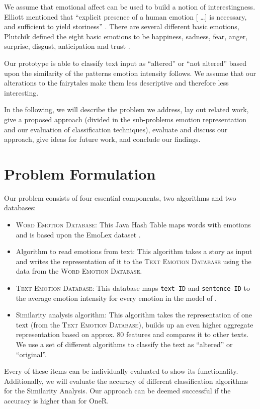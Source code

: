 \documentclass[letterpaper]{article}
\begin{document}
We assume that emotional affect can be used to build a notion of interestingness. Elliott mentioned that ``explicit presence of a human emotion [ \dots] is necessary, and sufficient to yield storiness'' \cite{elliott}. There are several different basic emotions, Plutchik defined the eight basic emotions to be happiness, sadness, fear, anger, surprise, disgust, anticipation and trust \cite{plutchik1980emotion}. 

Our prototype is able to classify text input as ``altered'' or ``not altered'' based upon the similarity of the patterns emotion intensity follows. We assume that our alterations to the fairytales make them less descriptive and therefore less interesting. 

In the following, we will describe the problem we address, lay out related work, give a proposed approach (divided in the sub-problems emotion representation and our evaluation of classification techniques), evaluate and discuss our approach, give ideas for future work, and conclude our findings. 

\section{Problem Formulation}

Our problem consists of four essential components, two algorithms and two databases: 
\begin{itemize}
\item \textsc{Word Emotion Database}: This Java Hash Table maps words with emotions and is based upon the EmoLex dataset \cite{Mohammad}.
\item Algorithm to read emotions from text: This algorithm takes a story as input and writes the representation of it to the \textsc{Text Emotion Database} using the data from the \textsc{Word Emotion Database}.
\item \textsc{Text Emotion Database}: This database maps \texttt{text-ID} and \texttt{sentence-ID} to the average emotion intensity for every emotion in the model of \cite{plutchik1980emotion}.
\item Similarity analysis algorithm: This algorithm takes the representation of one text (from the \textsc{Text Emotion Database}), builds up an even higher aggregate representation based on approx. 80 features and compares it to other texts. We use a set of different algorithms to classify the text as ``altered'' or ``original''.
\end{itemize}

\noindent Every of these items can be individually evaluated to show its functionality. Additionally, we will evaluate the accuracy of different classification algorithms for the Similarity Analysis. Our approach can be deemed successful if the accuracy is higher than for OneR. 
\end{document}
